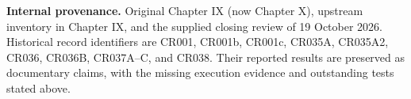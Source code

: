 \noindent\textbf{Internal provenance.} Original Chapter IX (now Chapter X), upstream inventory in Chapter IX, and the supplied closing review of 19 October 2026. Historical record identifiers are CR001, CR001b, CR001c, CR035A, CR035A2, CR036, CR036B, CR037A--C, and CR038. Their reported results are preserved as documentary claims, with the missing execution evidence and outstanding tests stated above.
